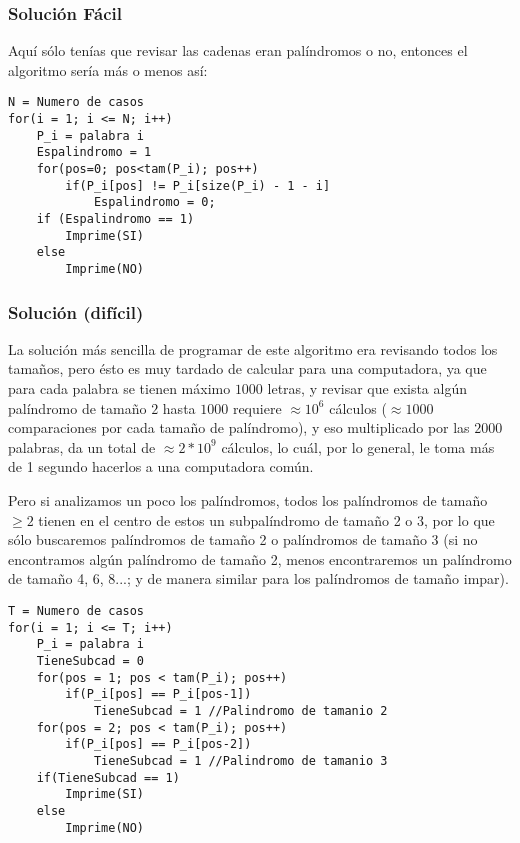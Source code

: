 \subsubsection*{Solución Fácil}

Aquí sólo tenías que revisar las cadenas eran palíndromos o no, entonces el algoritmo sería más o menos así:

\begin{lstlisting}
N = Numero de casos
for(i = 1; i <= N; i++)
	P_i = palabra i
    Espalindromo = 1
    for(pos=0; pos<tam(P_i); pos++)
    	if(P_i[pos] != P_i[size(P_i) - 1 - i]
        	Espalindromo = 0;
    if (Espalindromo == 1)
    	Imprime(SI)
    else
    	Imprime(NO)
\end{lstlisting}

\subsubsection*{Solución (difícil)}

La solución más sencilla de programar de este algoritmo era revisando todos los tamaños, pero ésto es muy tardado de calcular para una computadora, ya que para cada palabra se tienen máximo $1000$ letras, y revisar que exista algún palíndromo de tamaño $2$ hasta $1000$ requiere $\approx 10^6$ cálculos ($\approx 1000$ comparaciones por cada tamaño de palíndromo), y eso multiplicado por las $2000$ palabras, da un total de $\approx 2 * 10^9$ cálculos, lo cuál, por lo general, le toma más de 1 segundo hacerlos a una computadora común.

Pero si analizamos un poco los palíndromos, todos los palíndromos de tamaño $\geq 2$ tienen en el centro de estos un subpalíndromo de tamaño 2 o 3, por lo que sólo buscaremos palíndromos de tamaño 2 o palíndromos de tamaño 3 (si no encontramos algún palíndromo de tamaño 2, menos encontraremos un palíndromo de tamaño 4, 6, 8...; y de manera similar para los palíndromos de tamaño impar).

\begin{lstlisting}
T = Numero de casos
for(i = 1; i <= T; i++)
	P_i = palabra i
    TieneSubcad = 0
    for(pos = 1; pos < tam(P_i); pos++)
    	if(P_i[pos] == P_i[pos-1])
        	TieneSubcad = 1 //Palindromo de tamanio 2
    for(pos = 2; pos < tam(P_i); pos++)
    	if(P_i[pos] == P_i[pos-2])
        	TieneSubcad = 1 //Palindromo de tamanio 3
    if(TieneSubcad == 1)
    	Imprime(SI)
    else
    	Imprime(NO)

\end{lstlisting}



